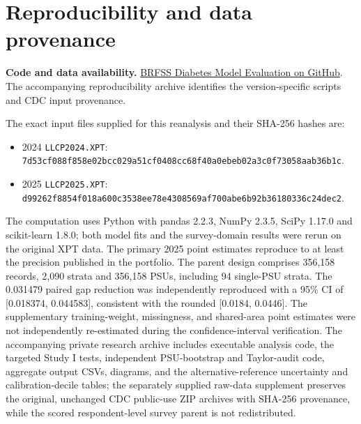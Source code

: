 \section{Reproducibility and data provenance}
\noindent\textbf{Code and data availability.} \href{https://github.com/alrashedinaifrr/brfss-diabetes-model-evaluation}{BRFSS Diabetes Model Evaluation on GitHub}. The accompanying reproducibility archive identifies the version-specific scripts and CDC input provenance.\par\smallskip
The exact input files supplied for this reanalysis and their SHA-256 hashes are:
\begin{itemize}
\item 2024 \texttt{LLCP2024.XPT}:\\ {\footnotesize\texttt{7d53cf088f858e02bcc029a51cf0408cc68f40a0ebeb02a3c0f73058aab36b1c}}.
\item 2025 \texttt{LLCP2025.XPT}:\\ {\footnotesize\texttt{d99262f8854f018a600c3538ee78e4308569af700abe6b92b36180336c24dec2}}.
\end{itemize}
The computation uses Python with pandas 2.2.3, NumPy 2.3.5, SciPy 1.17.0 and scikit-learn 1.8.0; both model fits and the survey-domain results were rerun on the original XPT data. The primary 2025 point estimates reproduce to at least the precision published in the portfolio. The parent design comprises 356,158 records, 2,090 strata and 356,158 PSUs, including 94 single-PSU strata. The 0.031479 paired gap reduction was independently reproduced with a 95\% CI of [0.018374, 0.044583], consistent with the rounded [0.0184, 0.0446]. The supplementary training-weight, missingness, and shared-area point estimates were not independently re-estimated during the confidence-interval verification. The accompanying private research archive includes executable analysis code, the targeted Study I tests, independent PSU-bootstrap and Taylor-audit code, aggregate output CSVs, diagrams, and the alternative-reference uncertainty and calibration-decile tables; the separately supplied raw-data supplement preserves the original, unchanged CDC public-use ZIP archives with SHA-256 provenance, while the scored respondent-level survey parent is not redistributed.

